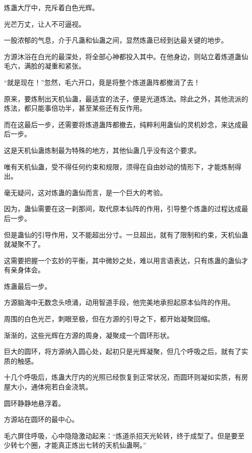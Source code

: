
\begin{this_body}

炼蛊大厅中，充斥着白色光辉。

光芒万丈，让人不可逼视。

一股浓郁的气息，介于凡蛊和仙蛊之间，显然炼蛊已经到达最关键的地步。

方源沐浴在白光的最深处，将全部心神都投入其中。在他身边，则站立着炼道蛊仙毛六，满脸的凝重和紧张。

“就是现在！”忽然，毛六开口，竟是将整个炼道蛊阵都撤消了去！

原来，要炼制出天机仙蛊，最适宜的法子，便是光道炼法。除此之外，其他流派的炼法，都只能事倍功半，甚至某些还有反作用。

而在这最后一步，还需要将炼道蛊阵都撤去，纯粹利用蛊仙的灵机妙念，来达成最后一步。

这是天机仙蛊炼制最为特殊的地方，其他仙蛊几乎没有这个要求。

唯有天机仙蛊，受不得任何约束和规限，须得在自由妙动的情形下，才能炼制得出。

毫无疑问，这对炼蛊的蛊仙而言，是一个巨大的考验。

因为，蛊仙需要在这一刹那间，取代原本仙阵的作用，引导整个炼蛊的过程达成最后一步。

但是蛊仙的引导作用，又不能超出分寸。一旦超出，就有了限制和约束，天机仙蛊就凝聚不了。

这需要把握一个玄妙的平衡，其中微妙之处，难以用言语表达，只有炼蛊的蛊仙才有亲身体会。

炼蛊最后一步。

方源脑海中无数念头喷涌，动用智道手段，他完美地承担起原本仙阵的作用。

周围的白色光芒，刺眼至极，但在方源的引导之下，都开始凝聚回缩。

渐渐的，这些光辉在方源的周身，凝聚成一个圆环形状。

巨大的圆环，将方源纳入圆心处，起初只是光辉凝聚，但几个呼吸之后，就有了实质的触感。

十几个呼吸后，炼蛊大厅内的光照已经恢复到正常状况，而圆环则凝如实质，有房屋大小，通体宛若白金浇筑。

圆环静静地悬浮着。

方源站在圆环的最中心。

毛六屏住呼吸，心中隐隐激动起来：“炼道杀招天光轮转，终于成型了。但是要至少转七个圈，才能真正炼出七转的天机仙蛊啊。”


\end{this_body}
